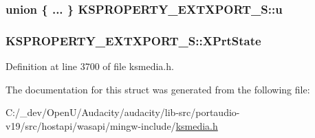 \subsubsection[{\texorpdfstring{u}{u}}]{\setlength{\rightskip}{0pt plus 5cm}union \{ ... \}   K\+S\+P\+R\+O\+P\+E\+R\+T\+Y\+\_\+\+E\+X\+T\+X\+P\+O\+R\+T\+\_\+\+S\+::u}\hypertarget{struct_k_s_p_r_o_p_e_r_t_y___e_x_t_x_p_o_r_t___s_a33132f25b599e8475388074be337fc1e}{}\label{struct_k_s_p_r_o_p_e_r_t_y___e_x_t_x_p_o_r_t___s_a33132f25b599e8475388074be337fc1e}
\subsubsection[{\texorpdfstring{X\+Prt\+State}{XPrtState}}]{ K\+S\+P\+R\+O\+P\+E\+R\+T\+Y\+\_\+\+E\+X\+T\+X\+P\+O\+R\+T\+\_\+\+S\+::\+X\+Prt\+State}\hypertarget{struct_k_s_p_r_o_p_e_r_t_y___e_x_t_x_p_o_r_t___s_a466b92a96dadcd08d2624cf9a55fbe9f}{}\label{struct_k_s_p_r_o_p_e_r_t_y___e_x_t_x_p_o_r_t___s_a466b92a96dadcd08d2624cf9a55fbe9f}


Definition at line 3700 of file ksmedia.\+h.



The documentation for this struct was generated from the following file\+:\begin{DoxyCompactItemize}
\item 
C\+:/\+\_\+dev/\+Open\+U/\+Audacity/audacity/lib-\/src/portaudio-\/v19/src/hostapi/wasapi/mingw-\/include/\hyperlink{ksmedia_8h}{ksmedia.\+h}\end{DoxyCompactItemize}
